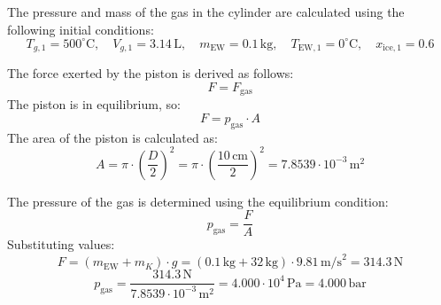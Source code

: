 The pressure and mass of the gas in the cylinder are calculated using the following initial conditions:  
\[
T_{g,1} = 500^\circ\text{C}, \quad V_{g,1} = 3.14 \, \text{L}, \quad m_{\text{EW}} = 0.1 \, \text{kg}, \quad T_{\text{EW},1} = 0^\circ\text{C}, \quad x_{\text{ice},1} = 0.6
\]  

The force exerted by the piston is derived as follows:  
\[
F = F_{\text{gas}}
\]  
The piston is in equilibrium, so:  
\[
F = p_{\text{gas}} \cdot A
\]  
The area of the piston is calculated as:  
\[
A = \pi \cdot \left( \frac{D}{2} \right)^2 = \pi \cdot \left( \frac{10 \, \text{cm}}{2} \right)^2 = 7.8539 \cdot 10^{-3} \, \text{m}^2
\]  

The pressure of the gas is determined using the equilibrium condition:  
\[
p_{\text{gas}} = \frac{F}{A}
\]  
Substituting values:  
\[
F = (m_{\text{EW}} + m_K) \cdot g = (0.1 \, \text{kg} + 32 \, \text{kg}) \cdot 9.81 \, \text{m/s}^2 = 314.3 \, \text{N}
\]  
\[
p_{\text{gas}} = \frac{314.3 \, \text{N}}{7.8539 \cdot 10^{-3} \, \text{m}^2} = 4.000 \cdot 10^4 \, \text{Pa} = 4.000 \, \text{bar}
\]